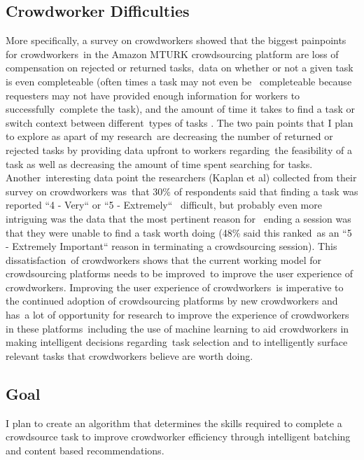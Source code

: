 \documentclass[letterpaper,12pt]{article}
\begin{document}
\subsection{Crowdworker Difficulties}
More specifically, a survey on crowdworkers showed that the biggest painpoints for crowdworkers\
in the Amazon MTURK crowdsourcing platform are loss of compensation on rejected or returned tasks,\
data on whether or not a given task is even completeable (often times a task may not even be \
completeable because requesters may not have provided enough information for workers to successfully\
complete the task), and the amount of time it takes to find a task or switch context between different\
types of tasks \cite{Kaplan2018}. The two pain points that I plan to explore as apart of my research\
are decreasing the number of returned or rejected tasks by providing data upfront to workers regarding\
the feasibility of a task as well as decreasing the amount of time spent searching for tasks. Another\
interesting data point the researchers (Kaplan et al) collected from their survey on crowdworkers was\
that 30\% of respondents said that finding a task was reported ``4 - Very`` or ``5 - Extremely`` \
difficult, but probably even more intriguing was the data that the most pertinent reason for \
ending a session was that they were unable to find a task worth doing (48\% said this ranked\
as an ``5 - Extremely Important`` reason in terminating a crowdsourcing session). \cite{Kaplan2018} This dissatisfaction\
of crowdworkers shows that the current working model for crowdsourcing platforms needs to be improved\
to improve the user experience of crowdworkers. Improving the user experience of crowdworkers\
is imperative to the continued adoption of crowdsourcing platforms by new crowdworkers and has\
a lot of opportunity for research to improve the experience of crowdworkers in these platforms\
including the use of machine learning to aid crowdworkers in making intelligent decisions regarding\
task selection and to intelligently surface relevant tasks that crowdworkers believe are worth doing.

\subsection{Goal}
I plan to create an algorithm that determines the skills required to complete a crowdsource task to
improve crowdworker efficiency through intelligent batching and content based recommendations.
\end{document}
